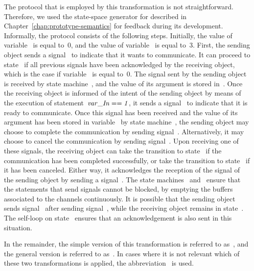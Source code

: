 The protocol that is employed by this transformation is not straightforward.
Therefore, we used the state-space generator for \SLCO described in Chapter~\ref{chap:prototype-semantics} for feedback during its development.
Informally, the protocol consists of the following steps.
Initially, the value of variable~ is equal to~0, and the value of variable~ is equal to~3.
First, the sending object sends a signal~ to indicate that it wants to communicate.
It can proceed to state~ if all previous signals have been acknowledged by the receiving object, which is the case if variable~ is equal to~0.
The signal sent by the sending object is received by state machine~, and the value of its argument is stored in~.
Once the receiving object is informed of the intent of the sending object by means of the execution of statement~$\it{var\_In}==1$, it sends a signal~ to indicate that it is ready to communicate.
Once this signal has been received and the value of its argument has been stored in variable~ by state machine~, the sending object may choose to complete the communication by sending signal~.
Alternatively, it may choose to cancel the communication by sending signal~.
Upon receiving one of these signals, the receiving object can take the transition to state~ if the communication has been completed successfully, or take the transition to state~ if it has been canceled.
Either way, it acknowledges the reception of the signal of the sending object by sending a signal~.
The state machines~ and~ ensure that the statements that send signals cannot be blocked, by emptying the buffers associated to the channels continuously.
It is possible that the sending object sends signal~ after sending signal~, while the receiving object remains in state~.
The self-loop on state~ ensures that an acknowledgement is also sent in this situation.

In the remainder, the simple version of this transformation is referred to as~\TSim, and the general version is referred to as~\TGen.
In cases where it is not relevant which of these two transformations is applied, the abbreviation~ is used.

